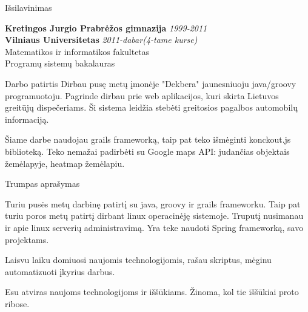 \documentclass[]{resume} %
\begin{document}

\begin{rSection}{Išsilavinimas}

{\bf Kretingos Jurgio Prabrėžos gimnazija} \hfill {\em 1999-2011} \\ 
{\bf Vilniaus Universitetas} \hfill {\em 2011-dabar(4-tame kurse)} \\ 
Matematikos ir informatikos fakultetas\\
Programų sistemų bakalauras\\

\end{rSection}

\begin{rSection}{Darbo patirtis}
Dirbau pusę metų įmonėje "Dekbera" jaunesniuoju java/groovy programuotoju.
Pagrinde dirbau prie web aplikacijos, kuri skirta Lietuvos greitūjų dispečeriams.
Ši sistema leidžia stebėti greitosios pagalbos automobilų informaciją. 

Šiame darbe naudojau grails frameworką, taip pat teko išmėginti konckout.js biblioteką. 
Teko nemažai padirbėti su Google maps API: judančias objektais žemėlapyje, heatmap žemėlapiu.
\end{rSection}
\begin{rSection}{Trumpas aprašymas}

Turiu pusės metų darbinę patirtį su java, groovy ir grails frameworku.
Taip pat turiu poros metų patirtį dirbant linux operacinėję sistemoje. 
Truputį nusimanau ir apie linux serverių administravimą. 
Yra teke naudoti Spring frameworką, savo projektams.

Laisvu laiku domiuosi naujomis technologijomis, rašau skriptus, mėginu automatizuoti įkyrius darbus.

Esu atviras naujoms technologijoms ir iššūkiams. Žinoma, kol tie iššūkiai proto ribose.
 
\end{rSection}
\end{document}
